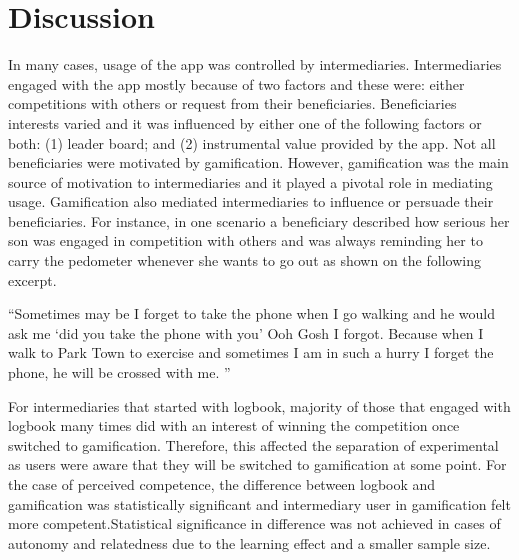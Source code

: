 \section{Discussion}
In many cases, usage of the app was controlled by intermediaries. Intermediaries engaged with the app mostly because of two factors and these were: either competitions with others or request from their beneficiaries. Beneficiaries interests varied and it was influenced by  either one of the following factors or both: (1) leader board; and (2) instrumental value provided by the app. Not all beneficiaries were motivated by gamification. However, gamification was the main source of motivation to intermediaries and it played a pivotal role in mediating usage. Gamification also mediated intermediaries to influence or persuade their beneficiaries.  For instance, in one scenario a beneficiary described how serious her son was engaged in competition with others and was always reminding her to carry the pedometer whenever she wants to go out as shown on the following excerpt.

 {``Sometimes may be I forget to take the phone when I go walking and he would ask me `did you take the phone with you' Ooh Gosh I forgot.  Because when I walk to Park Town to exercise and sometimes  I am in such a hurry I forget the phone, he will be crossed with me. ''} 

For intermediaries that started with logbook, majority of those that engaged with logbook many times did with an interest of winning the competition once switched to gamification. Therefore, this affected the separation of experimental as users were aware that they will be switched to gamification at some point. For the case of perceived competence, the difference between logbook and gamification was statistically significant and intermediary user in gamification felt more competent.Statistical significance in difference was not achieved in cases of autonomy and relatedness due to the learning effect and a smaller sample size. 

